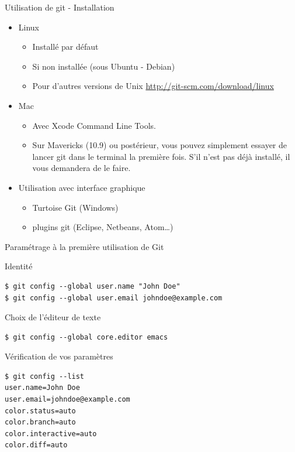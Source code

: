 

\begin{frame}{%
\protect\hypertarget{utilisation-de-git}{%
Utilisation de git - Installation}}

\begin{itemize}
\tightlist
\item \alert{Linux}

	\begin{itemize}
	\item Installé par défaut
	\item Si non installée  (sous Ubuntu - Debian)
	\item Pour d'autres versions de Unix \url{http://git-scm.com/download/linux}
	\end{itemize}

\item
  \alert{Mac}
	\begin{itemize}
	\item Avec Xcode Command Line Tools.
	\item Sur Mavericks (10.9) ou postérieur, vous pouvez simplement essayer de lancer git dans le terminal la première fois. S’il n’est pas déjà installé, il vous demandera de le faire.
	\end{itemize}

\item Utilisation \alert{avec interface graphique}
	\begin{itemize}
	\item	  Turtoise Git (Windows)
	\item   plugins git (Eclipse, Netbeans, Atom\ldots{})
	\end{itemize}
\end{itemize}

\end{frame}




\begin{frame}[fragile]
{%
\protect\hypertarget{utilisation-de-git}{%
Paramétrage à la première utilisation de Git}}

Identité

\begin{lstlisting}
$ git config --global user.name "John Doe"
$ git config --global user.email johndoe@example.com
\end{lstlisting}

Choix de l'éditeur de texte

\begin{lstlisting}
$ git config --global core.editor emacs
\end{lstlisting}

Vérification de vos paramètres

\begin{lstlisting}
$ git config --list
user.name=John Doe
user.email=johndoe@example.com
color.status=auto
color.branch=auto
color.interactive=auto
color.diff=auto
\end{lstlisting}

\end{frame}

